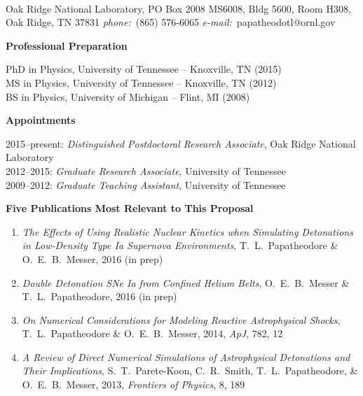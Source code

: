 \documentclass[11pt,letterpaper,english]{article}
\begin{document}
\setlength{\parindent}{0in} %

\pagestyle{fancy}   \renewcommand{%
\headrulewidth}{0.0pt}



\\
{Oak Ridge National Laboratory, PO Box 2008 MS6008, Bldg 5600, Room H308, Oak Ridge, TN 37831}
{\it phone:}~(865) 576-6065 \hskip 2mm
{\it e-mail:}~papatheodotl@ornl.gov \hskip 2mm

\begin{flushleft} {\bf Professional Preparation}
{\parindent 16pt

PhD in Physics, University of Tennessee -- Knoxville, TN (2015)\\ 
MS in Physics, University of Tennessee -- Knoxville, TN (2012) \\ 
BS in Physics, University of Michigan -- Flint, MI (2008)\\ 
}

\vspace{.04in}
{\bf Appointments}
{\parindent 16pt

2015--present: {\it Distinguished Postdoctoral Research Associate}, Oak Ridge National Laboratory \\ 
2012--2015: {\it Graduate Research Associate}, University of Tennessee \\ 
2009--2012: {\it Graduate Teaching Assistant}, University of Tennessee \\ 
}

\vspace{.04in}
{\bf Five Publications Most Relevant to This Proposal}
\vspace{-6pt}
\begin{enumerate} \itemsep1pt \parskip0pt 
\item {\it The Effects of Using Realistic Nuclear Kinetics when Simulating Detonations in Low-Density Type Ia Supernova Environments}, T.~L.~Papatheodore \& O.~E.~B.~Messer, 2016 (in prep) \\ 
\item {\it Double Detonation SNe Ia from Confined Helium Belts}, O.~E.~B.~Messer \& T.~L.~Papatheodore, 2016 (in prep) \\ 
\item {\it On Numerical Considerations for Modeling Reactive Astrophysical Shocks}, T.~L.~Papatheodore \& O.~E.~B.~Messer, 2014, {\it ApJ}, 782, 12 \\ 
\item {\it A Review of Direct Numerical Simulations of Astrophysical Detonations and Their Implications}, S.~T.~Parete-Koon, C.~R.~Smith, T.~L.~Papatheodore, \& O.~E.~B.~Messer, 2013, {\it Frontiers of Physics}, 8, 189 \\ 
\end{enumerate} 


\end{flushleft}
\end{document}
